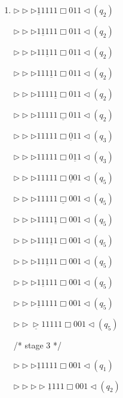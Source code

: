 \documentclass[12pt,a4paper]{article}
\makeatletter
\newtheorem*{solution}{Solution}
\theoremstyle{definition}
\renewenvironment{solution}[1][Solution] {\par\pushQED{\qed}\normalfont\topsep6\p@\@plus6\p@\relax\trivlist\item[\hskip\labelsep\bfseries#1\@addpunct{.}]\ignorespaces}{\popQED\endtrivlist\@endpefalse} \makeatother
\makeatother
\begin{document}
\begin{enumerate}
\begin{solution}
\begin{minipage}{0.3\textwidth}
		$\triangleright\triangleright\triangleright\underline{1}1111\Box011\triangleleft(q_2)$
		
		$\triangleright\triangleright\triangleright1\underline{1}111\Box011\triangleleft(q_2)$
		
		$\triangleright\triangleright\triangleright11\underline{1}11\Box011\triangleleft(q_2)$
		
		$\triangleright\triangleright\triangleright111\underline{1}1\Box011\triangleleft(q_2)$
		
		$\triangleright\triangleright\triangleright1111\underline{1}\Box011\triangleleft(q_2)$
		
		$\triangleright\triangleright\triangleright11111\underline{\Box}011\triangleleft(q_2)$
		
		$\triangleright\triangleright\triangleright11111\Box\underline{0}11\triangleleft(q_3)$
		
		$\triangleright\triangleright\triangleright11111\Box0\underline{1}1\triangleleft(q_3)$
		
		$\triangleright\triangleright\triangleright11111\Box\underline{0}01\triangleleft(q_5)$
		
	\end{minipage}
	\begin{minipage}{0.3\textwidth}
		\centering
		
		$\triangleright\triangleright\triangleright11111\underline{\Box}001\triangleleft(q_5)$
		
		$\triangleright\triangleright\triangleright1111\underline{1}\Box001\triangleleft(q_5)$
		
		$\triangleright\triangleright\triangleright111\underline{1}1\Box001\triangleleft(q_5)$
		
		$\triangleright\triangleright\triangleright11\underline{1}11\Box001\triangleleft(q_5)$
		
		$\triangleright\triangleright\triangleright1\underline{1}111\Box001\triangleleft(q_5)$
		
		$\triangleright\triangleright\triangleright\underline{1}1111\Box001\triangleleft(q_5)$
		
		$\triangleright\triangleright\underline{\triangleright}11111\Box001\triangleleft(q_5)$
		
		\quad
		
		/* stage 3 */
		
		$\triangleright\triangleright\triangleright\underline{1}1111\Box001\triangleleft(q_1)$
		
		$\triangleright\triangleright\triangleright\triangleright\underline{1}111\Box001\triangleleft(q_2)$
		

\end{minipage}
\end{solution}
\end{enumerate}
\end{document}
